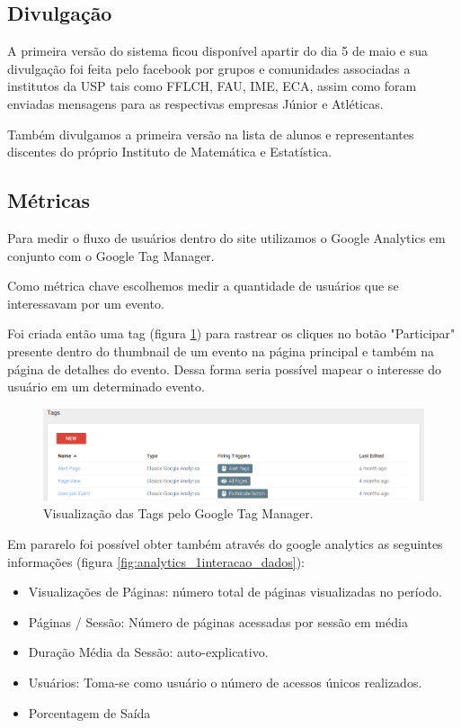 \subsection{Divulgação}
\par A primeira versão do sistema ficou disponível apartir do dia 5 de maio e sua divulgação foi feita pelo facebook por grupos e comunidades associadas a institutos da USP tais como FFLCH, FAU, IME, ECA, assim como foram enviadas mensagens para as respectivas empresas Júnior e Atléticas.
\par Também divulgamos a primeira versão na lista de alunos e representantes discentes do próprio Instituto de Matemática e Estatística.
\subsection{Métricas}
\par Para medir o fluxo de usuários dentro do site utilizamos o Google Analytics em conjunto com o Google Tag Manager.
\par Como métrica chave escolhemos medir a quantidade de usuários que se interessavam por um evento.
\par Foi criada então uma tag (figura \ref{fig:tags}) para rastrear os cliques no botão "Participar" presente dentro do thumbnail de um evento na página principal  e também na página de detalhes do evento. Dessa forma seria possível mapear o interesse do usuário em um determinado evento.
\begin{figure}[htb]
\includegraphics[width=15cm]{figuras/tags}
\caption{\label{fig:tags} Visualização das Tags pelo Google Tag Manager.}
\end{figure}
\par Em pararelo foi possível obter também através do google analytics as seguintes  informações (figura \ref{fig:analytics_1interacao_dados}):
\begin{itemize}
\item Visualizações de Páginas: número total de páginas visualizadas no período.
\item Páginas / Sessão: Número de páginas acessadas por sessão em média
\item Duração Média da Sessão: auto-explicativo.
\item Usuários: Toma-se como usuário o número de acessos únicos realizados.
\item Porcentagem de Saída
\end{itemize}

